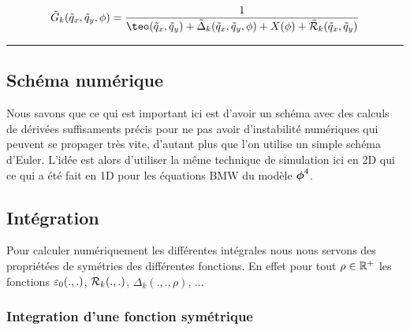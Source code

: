 \documentclass[10pt]{article}
\begin{document}
\begin{equation}
\tG_k(\tq_x,\tq_y,\phi) = \frac{1}{\teo(\tq_x, \tq_y) + \tDelta_k(\tq_x, \tq_y, \phi) + X(\phi) + \tRc_k(\tq_x, \tq_y) }
\end{equation}
\vspace*{11pt}
\hfill \rule{9cm}{1pt}
\begin{multicols}{2}

\section{Schéma numérique}

Nous savons que ce qui est important ici est d'avoir un schéma avec des calculs de dérivées suffisaments précis pour ne pas avoir d'instabilité numériques qui peuvent se propager très vite, d'autant plus que l'on utilise un simple schéma d'Euler. L'idée est alors d'utiliser la même technique de simulation ici en 2D qui ce qui a été fait en 1D pour les équations BMW du modèle $\boldsymbol{ \phi}^4$.

\subsection{Intégration}

Pour calculer numériquement les différentes intégrales nous nous servons des propriétées de symétries des différentes fonctions. En effet pour tout $\rho \in \mathbb{R}^+$ les fonctions $\varepsilon_0(.,.)$, $\mathcal{R}_k(.,.)$, $\Delta_k(.,.,\rho)$, ...

\subsubsection{Integration d'une fonction symétrique}


\end{multicols}
\end{document}

